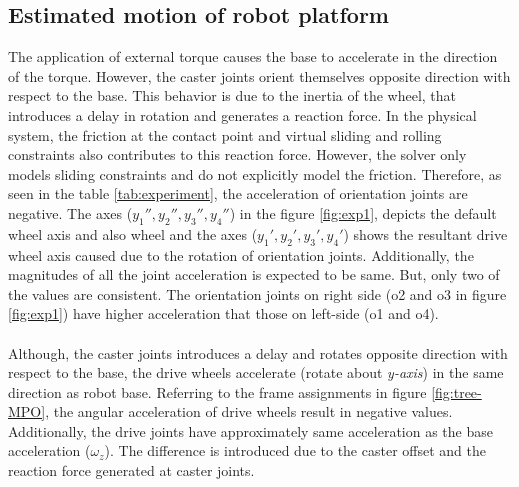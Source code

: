 \subsection{Estimated motion of robot platform}
The application of external torque causes the base to accelerate in the direction of the torque. However, the caster joints orient themselves opposite direction with respect to the base. This behavior is due to the inertia of the wheel, that introduces a delay in rotation and generates a reaction force. In the physical system, the friction at the contact point and virtual sliding and rolling constraints also contributes to this reaction force. However, the solver only models sliding constraints and do not explicitly model the friction. Therefore, as seen in the table \ref{tab:experiment}, the acceleration of orientation joints are negative. The axes ($y_1'', y_2'', y_3'', y_4''$) in the figure \ref{fig:exp1}, depicts the default wheel axis and also wheel and the axes ($y_1', y_2', y_3', y_4'$) shows the resultant drive wheel axis caused due to the rotation of orientation joints. Additionally, the magnitudes of all the joint acceleration is expected to be same. But, only two of the values are consistent. The orientation joints on right side (o2 and o3 in figure \ref{fig:exp1}) have higher acceleration that those on left-side (o1 and o4).


\paragraph{}Although, the caster joints introduces a delay and rotates opposite direction with respect to the base, the drive wheels accelerate (rotate about \textit{y-axis}) in the same direction as robot base. Referring to the frame assignments in figure \ref{fig:tree-MPO}, the angular acceleration of drive wheels result in negative values. Additionally, the drive joints have approximately same acceleration as the base acceleration ($\omega_z$). The difference is introduced due to the caster offset and the reaction force generated at caster joints.

